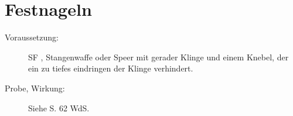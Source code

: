\section{Festnageln}
\label{bAT.festnageln}
\begin{description}
    \item[Voraussetzung:]
        SF , Stangenwaffe oder Speer mit gerader Klinge und einem Knebel, der ein zu tiefes eindringen der Klinge verhindert.
    \item[Probe, Wirkung:]
        Siehe S. 62 WdS.
\end{description}
